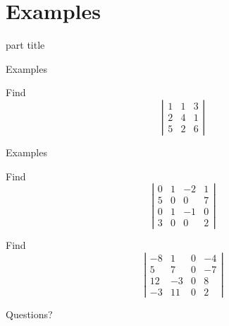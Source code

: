 \documentclass{beamer}
\begin{document}
\section{Examples}

\begin{frame}
  \begin{beamercolorbox}[sep=12pt,center]{part title}
    \insertsection\par
  \end{beamercolorbox}
\end{frame}

\begin{frame}{Examples}
  
  \begin{example}
    Find
    \begin{equation*}
      \left|
	\begin{array}{ccc}
          1&1&3\\
          2&4&1\\
          5&2&6
	\end{array}
      \right|
    \end{equation*}
  \end{example}
\end{frame}

\begin{frame}{Examples}
  \begin{example}
    Find
    \begin{equation*}
      \left|
        \begin{array}{cccc}
          0&1&-2&1\\
          5&0&0&7\\
          0&1&-1&0\\
          3&0&0&2
        \end{array}
      \right|
    \end{equation*}
  \end{example}
  \begin{example}
    Find
    \begin{equation*}
      \left|
        \begin{array}{cccc}
          -8&1&0&-4\\
          5&7&0&-7\\
          12&-3&0&8\\
          -3&11&0&2
        \end{array}
      \right|
    \end{equation*}
  \end{example}
\end{frame}

\begin{frame}
  Questions?
\end{frame}
\end{document}
